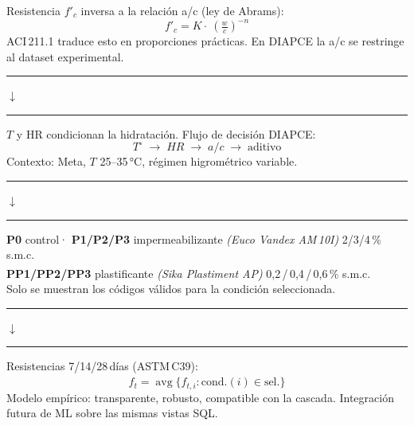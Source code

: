 \documentclass[10pt]{article}
\newcommand{\flowconn}[1]{%
  \vspace{0.5mm}%
  \begin{center}%
    \textcolor{#1}{\rule{2cm}{0.8pt}\enspace$\downarrow$\enspace\rule{2cm}{0.8pt}}%
  \end{center}%
  \vspace{0.5mm}%
}
\begin{document}
\hfill
\begin{minipage}[t]{0.2425\textwidth}

  \begin{tcolorbox}[subbox, title=Marco Teórico — Ley de Abrams / ACI\,211.1]
    \small
    Resistencia $f'_c$ inversa a la relación a/c (ley de Abrams):
    \[ f'_c = K\cdot\!\ \left(\tfrac{w}{c}\right)^{-n} \]
    ACI\,211.1 traduce esto en proporciones prácticas.
    En DIAPCE la a/c se restringe al dataset experimental.
  \end{tcolorbox}

  \flowconn{pinkprimary}

  \begin{tcolorbox}[subbox, title=Marco Teórico — Condiciones Ambientales]
    \small
    $T$ y HR condicionan la hidratación. Flujo de decisión DIAPCE:
    \[ T^{\circ}\;{\rightarrow}\;HR\;{\rightarrow}\;a/c\;{\rightarrow}\;\text{aditivo} \]
    Contexto: Meta, $T$ 25–35\,°C, régimen higrométrico variable.
  \end{tcolorbox}

  \flowconn{pinkprimary}

  \begin{tcolorbox}[subbox, title=Marco Teórico — Aditivos P0–PP3 (ASTM\,C494)]
    \small
    \textbf{P0} control\enspace·\enspace
    \textbf{P1/P2/P3} impermeabilizante \textit{(Euco Vandex AM\,10I)} 2/3/4\,\% s.m.c.\\
    \textbf{PP1/PP2/PP3} plastificante \textit{(Sika\textsuperscript{\textregistered} Plastiment\textsuperscript{\textregistered} AP)} 0{,}2\,/\,0{,}4\,/\,0{,}6\,\% s.m.c.\\
    Solo se muestran los códigos válidos para la condición seleccionada.
  \end{tcolorbox}

  \flowconn{pinkprimary}

  \begin{tcolorbox}[subbox, title=Marco Teórico — Proyección y Modelado]
    \small
    Resistencias 7/14/28\,días (ASTM\,C39):
    \[ \hat{f}_{t}=\operatorname{avg}\{f_{t,i}:\text{cond.}(i)\in\text{sel.}\} \]
    Modelo empírico: transparente, robusto, compatible con la cascada.
    Integración futura de ML sobre las mismas vistas SQL.
  \end{tcolorbox}

\end{minipage}
\hfill
\end{document}
